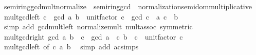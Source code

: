 \begin{isabellebody}
{\isafoldproof}%
%
\isadelimproof
\isanewline
%
\endisadelimproof
\isanewline
{}\isamarkupfalse%
%
\isadelimdocument
%
\endisadelimdocument
%
\isatagdocument
%
\isamarkuptrue%
%
\endisatagdocument
{\isafolddocument}%
%
\isadelimdocument
%
\endisadelimdocument
{}\isamarkupfalse%
\ semiring{\isacharunderscore}{\kern0pt}gcd{\isacharunderscore}{\kern0pt}mult{\isacharunderscore}{\kern0pt}normalize\ {\isacharequal}{\kern0pt}\ semiring{\isacharunderscore}{\kern0pt}gcd\ {\isacharplus}{\kern0pt}\ normalization{\isacharunderscore}{\kern0pt}semidom{\isacharunderscore}{\kern0pt}multiplicative\isanewline
{}\isanewline
\isanewline
{}\isamarkupfalse%
\ mult{\isacharunderscore}{\kern0pt}gcd{\isacharunderscore}{\kern0pt}left{\isacharcolon}{\kern0pt}\ {\isachardoublequoteopen}c\ {\isacharasterisk}{\kern0pt}\ gcd\ a\ b\ {\isacharequal}{\kern0pt}\ unit{\isacharunderscore}{\kern0pt}factor\ c\ {\isacharasterisk}{\kern0pt}\ gcd\ {\isacharparenleft}{\kern0pt}c\ {\isacharasterisk}{\kern0pt}\ a{\isacharparenright}{\kern0pt}\ {\isacharparenleft}{\kern0pt}c\ {\isacharasterisk}{\kern0pt}\ b{\isacharparenright}{\kern0pt}{\isachardoublequoteclose}\isanewline
%
\isadelimproof
\ \ %
\endisadelimproof
%
\isatagproof
{}\isamarkupfalse%
\ {\isacharparenleft}{\kern0pt}simp\ add{\isacharcolon}{\kern0pt}\ gcd{\isacharunderscore}{\kern0pt}mult{\isacharunderscore}{\kern0pt}left\ normalize{\isacharunderscore}{\kern0pt}mult\ mult{\isachardot}{\kern0pt}assoc\ {\isacharbrackleft}{\kern0pt}symmetric{\isacharbrackright}{\kern0pt}{\isacharparenright}{\kern0pt}%
\endisatagproof
{\isafoldproof}%
%
\isadelimproof
\isanewline
%
\endisadelimproof
\isanewline
{}\isamarkupfalse%
\ mult{\isacharunderscore}{\kern0pt}gcd{\isacharunderscore}{\kern0pt}right{\isacharcolon}{\kern0pt}\ {\isachardoublequoteopen}gcd\ a\ b\ {\isacharasterisk}{\kern0pt}\ c\ {\isacharequal}{\kern0pt}\ gcd\ {\isacharparenleft}{\kern0pt}a\ {\isacharasterisk}{\kern0pt}\ c{\isacharparenright}{\kern0pt}\ {\isacharparenleft}{\kern0pt}b\ {\isacharasterisk}{\kern0pt}\ c{\isacharparenright}{\kern0pt}\ {\isacharasterisk}{\kern0pt}\ unit{\isacharunderscore}{\kern0pt}factor\ c{\isachardoublequoteclose}\isanewline
%
\isadelimproof
\ \ %
\endisadelimproof
%
\isatagproof
{}\isamarkupfalse%
\ mult{\isacharunderscore}{\kern0pt}gcd{\isacharunderscore}{\kern0pt}left\ {\isacharbrackleft}{\kern0pt}of\ c\ a\ b{\isacharbrackright}{\kern0pt}\ \isamarkupfalse%
\ {\isacharparenleft}{\kern0pt}simp\ add{\isacharcolon}{\kern0pt}\ ac{\isacharunderscore}{\kern0pt}simps{\isacharparenright}{\kern0pt}%

\end{isabellebody}
